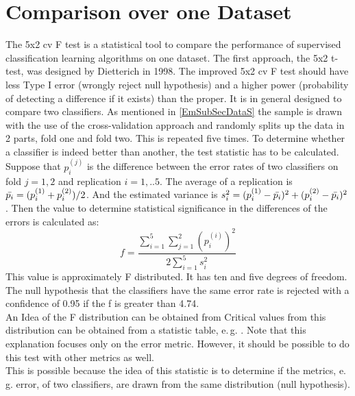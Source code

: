 \section{Comparison over one Dataset}\label{EmSecOneData}
The 5x2 cv F test is a statistical tool to compare the performance of supervised classification learning algorithms on one dataset. \cite{Chen.2009}
The first approach, the 5x2 t-test, was designed by Dietterich in 1998. \cite{Dietterich.1998}
The improved 5x2 cv F test should have less Type I error (wrongly reject null hypothesis) and a higher power (probability of detecting a difference if it exists) than the proper.\cite{Alpaydm.1999}
It is in general designed to compare two classifiers.
As mentioned in \ref{EmSubSecDataS} the sample is drawn with the use of the cross-validation approach and randomly splits up the data in 2 parts, fold one and fold two.
This is repeated five times. 
To determine whether a classifier is indeed better than another, the test statistic has to be calculated.\\
Suppose that $p_i^{(j)}$ is the difference between the error rates of two classifiers on fold $j = 1,2$ and replication $i=1,..5$.
The average of a replication is $\bar{p_i} = (p_i^{(1)}+p_i^{(2)})/2$.
And the estimated variance is $s_i^2=(p_i^{(1)}-\bar{p_i})^2+(p_i^{(2)}-\bar{p_i})^2$.
Then the value to determine statistical significance in the differences of the errors is calculated as:
\begin{equation}
	f = \frac{\sum_{i=1}^{5}\sum_{j=1}^{2}(p_i^{(i)})^2}{2\sum_{i=1}^{5}s_i^2}
\end{equation}
This value is approximately F distributed. It has ten and five degrees of freedom.
The null hypothesis that the classifiers have the same error rate is rejected with a confidence of 0.95 if the f is greater than 4.74. \\
An Idea of the F distribution can be obtained from \cite[p. 338-340]{Teschl.2014}
Critical values from this distribution can be obtained from a statistic table, e.\,g. \cite[p. 591]{Bortz.2010}.
Note that this explanation focuses only on the error metric.
However, it should be possible to do this test with other metrics as well.\\
This is possible because the idea of this statistic is to determine if the metrics, e.\,g. error, of two classifiers, are drawn from the same distribution (null hypothesis).\cite{Alpaydm.1999}

